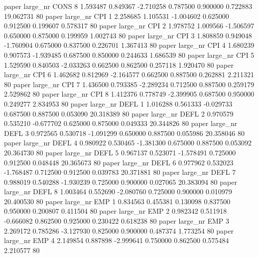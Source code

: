        paper   large_nr     CONS                 8  1.593487  0.849367  -2.710258 0.787500 0.900000  0.722883   19.062731 80
       paper   large_nr      CPI                 1  2.258685  1.105531  -1.004602 0.625000 0.912500  0.199607    0.578317 80
       paper   large_nr      CPI                 2  1.978752  1.009566  -1.506597 0.650000 0.875000  0.199959    1.002743 80
       paper   large_nr      CPI                 3  1.808859  0.949048  -1.760904 0.675000 0.837500  0.226701    1.367413 80
       paper   large_nr      CPI                 4  1.680239  0.907573  -1.939485 0.687500 0.850000  0.244633    1.686539 80
       paper   large_nr      CPI                 5  1.529590  0.840503  -2.033263 0.662500 0.862500  0.257118    1.920470 80
       paper   large_nr      CPI                 6  1.462682  0.812969  -2.164577 0.662500 0.887500  0.262881    2.211321 80
       paper   large_nr      CPI                 7  1.436500  0.793385  -2.289234 0.712500 0.887500  0.259179    2.529862 80
       paper   large_nr      CPI                 8  1.412376  0.778749  -2.399905 0.687500 0.950000  0.249277    2.834953 80
       paper   large_nr     DEFL                 1  1.016288  0.561333  -0.029733 0.687500 0.887500  0.053090   20.318389 80
       paper   large_nr     DEFL                 2  0.970579  0.535210  -0.677702 0.625000 0.875000  0.049333   20.344826 80
       paper   large_nr     DEFL                 3  0.972565  0.530718  -1.091299 0.650000 0.887500  0.055986   20.358046 80
       paper   large_nr     DEFL                 4  0.980922  0.530465  -1.381300 0.675000 0.887500  0.053092   20.364730 80
       paper   large_nr     DEFL                 5  0.967137  0.523071  -1.578491 0.725000 0.912500  0.048448   20.365673 80
       paper   large_nr     DEFL                 6  0.977962  0.532023  -1.768487 0.712500 0.912500  0.039783   20.371881 80
       paper   large_nr     DEFL                 7  0.988019  0.540288  -1.930239 0.725000 0.900000  0.027065   20.383094 80
       paper   large_nr     DEFL                 8  1.003464  0.552690  -2.080760 0.725000 0.900000  0.010979   20.400530 80
       paper   large_nr      EMP                 1  0.834563  0.455381   0.130098 0.837500 0.950000  0.200807    0.411504 80
       paper   large_nr      EMP                 2  0.982342  0.511918  -0.666082 0.862500 0.925000  0.230422    0.618238 80
       paper   large_nr      EMP                 3  2.269172  0.785286  -3.127930 0.825000 0.900000  0.487374    1.773254 80
       paper   large_nr      EMP                 4  2.149854  0.887898  -2.999641 0.750000 0.862500  0.575484    2.210577 80
